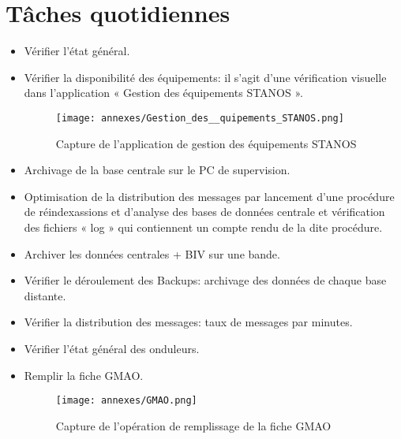 \section*{Tâches quotidiennes}
\begin{itemize}
\item Vérifier l’état général. \\
\item Vérifier la disponibilité des équipements: il s’agit d’une vérification visuelle dans l’application « Gestion des équipements STANOS ».
\begin{figure}[!h]
\begin{center}
\texttt{[image: annexes/Gestion\_des\_\_quipements\_STANOS.png]}
\end{center}
\caption{Capture de l'application de gestion des équipements STANOS}
\end{figure}
\item Archivage de la base centrale sur le PC de supervision.\\
\item Optimisation de la distribution des messages par lancement d’une procédure de réindexassions et d’analyse des bases de données centrale et vérification des fichiers « log » qui contiennent un compte rendu de la dite procédure.\\
\item Archiver les données centrales + BIV sur une bande.
\item Vérifier le déroulement des Backups: archivage des données de chaque base  distante.\\
\item Vérifier la distribution des messages: taux de messages par minutes.\\
\item Vérifier l’état général des onduleurs.\\
\item Remplir la fiche GMAO.\\
\begin{figure}[!h]
\begin{center}
\texttt{[image: annexes/GMAO.png]}
\end{center}
\caption{Capture de l'opération de remplissage de la fiche GMAO}
\end{figure}
\end{itemize}
